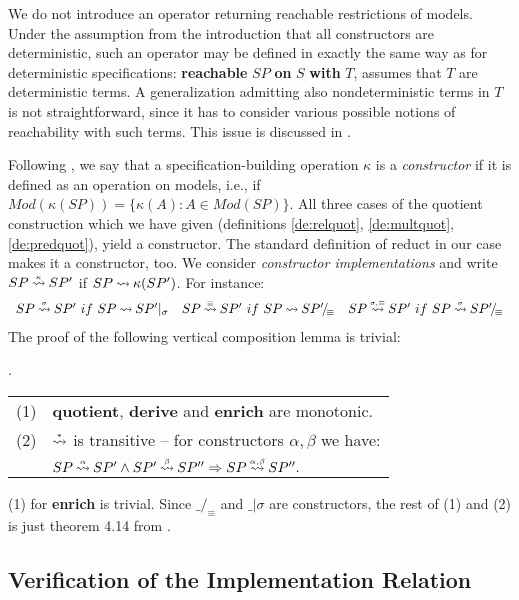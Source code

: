 We do not introduce an operator returning reachable restrictions of models. Under the assumption from the introduction that all constructors are deterministic, such an operator may be defined in exactly the same way as for deterministic 
specifications: {\bf reachable} $SP$ {\bf on} $S$ {\bf with} $T$, assumes that $T$ are deterministic terms. A generalization admitting also nondeterministic terms in $T$ is not straightforward, since it has to consider various possible notions of reachability with such terms. This issue is discussed in \cite{taps}.

Following \cite{ST}, we say that a specification-building operation $\kappa$ is
a {\em constructor} if it is defined as an operation on models, i.e., if $Mod(\kappa(SP)) = \{\kappa(A):A\in Mod(SP)\}$. All three cases of the quotient construction which we have given (definitions \ref{de:relquot}, \ref{de:multquot}, \ref{de:predquot}), yield a constructor. The standard definition of reduct in our case makes it a constructor, too. We consider 
{\em constructor
implementations} and write $SP\mathbin{\stackrel{\scriptscriptstyle \kappa}{\mathbin{\leadsto}}}SP'$ if $SP\mathbin{\leadsto} \kappa(SP')$. For instance:
\[\begin{array}{ccc}
SP\imm{\sigma} SP'\ if\ SP\im SP'|_\sigma & SP\imm{\equiv} SP'\ if\ SP \im \quot{SP'}\equiv & SP\imm{\sigma,\equiv} SP'\ if\ SP\imm{\sigma} \quot{SP'}\equiv \end{array} \]
\noindent
The proof of the following vertical composition lemma is trivial: 

\begin{LEMMA}\label{le:trans}. \begin{tabular}[t]{ll} (1) & {\bf quotient}, {\bf derive} and {\bf enrich} are monotonic. \\ (2) & $\mathbin{\stackrel{\scriptscriptstyle *}{\mathbin{\leadsto}}}$ is transitive -- for constructors $\alpha, \beta $ we have:\\ 
& $ SP\mathbin{\stackrel{\scriptscriptstyle \alpha}{\mathbin{\leadsto}}}SP'\land
SP'\mathbin{\stackrel{\scriptscriptstyle \beta}{\mathbin{\leadsto}}}SP''\mathrel\Rightarrow SP\mathbin{\stackrel{\scriptscriptstyle \alpha,\beta}{\mathbin{\leadsto}}}SP''.$ \end{tabular}
\end{LEMMA}
\begin{PROOF} (1) for {\bf enrich} is trivial. Since $\_/_\equiv$ and $\_|\sigma$ are
constructors, the rest of (1) and (2) is just theorem 4.14 from \cite{ST}. \end{PROOF}



\subsection{Verification of the Implementation Relation} 


